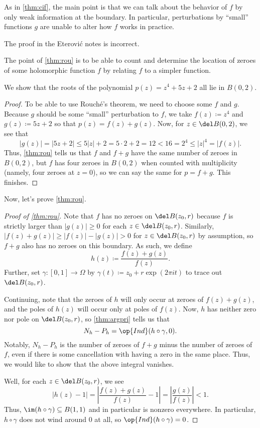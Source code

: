 \begin{remark}
	As in \autoref{thm:cif}, the main point is that we can talk about the behavior of $f$ by only weak information at the boundary. In particular, perturbations by ``small'' functions $g$ are unable to alter how $f$ works in practice.
\end{remark}
\begin{warn}
	The proof in the Eterovi\'c notes is incorrect.
\end{warn}
The point of \autoref{thm:rou} is to be able to count and determine the location of zeroes of some holomorphic function $f$ by relating $f$ to a simpler function.
\begin{exe}
	We show that the roots of the polynomial $p(z)=z^4+5z+2$ all lie in $B(0,2)$.
\end{exe}
\begin{proof}
	To be able to use Rouch\'e's theorem, we need to choose some $f$ and $g$. Because $g$ should be some ``small'' perturbation to $f$, we take $f(z)\coloneqq z^4$ and $g(z)\coloneqq 5z+2$ so that $p(z)=f(z)+g(z)$. Now, for $z\in\del B(0,2)$, we see that
	\[|g(z)|=|5z+2|\le5|z|+2=5\cdot2+2=12<16=2^4\le|z|^4=|f(z)|.\]
	Thus, \autoref{thm:rou} tells us that $f$ and $f+g$ have the same number of zeroes in $B(0,2)$, but $f$ has four zeroes in $B(0,2)$ when counted with multiplicity (namely, four zeroes at $z=0$), so we can say the same for $p=f+g$. This finishes.
\end{proof}
Now, let's prove \autoref{thm:rou}.
\begin{proof}[Proof of \autoref{thm:rou}]
	Note that $f$ has no zeroes on $\del B(z_0,r)$ because $f$ is strictly larger than $|g(z)|\ge0$ for each $z\in\del B(z_0,r)$. Similarly, $|f(z)+g(z)|\ge|f(z)|-|g(z)|>0$ for $z\in \del B(z_0,r)$ by assumption, so $f+g$ also has no zeroes on this boundary. As such, we define
	\[h(z)\coloneqq \frac{f(z)+g(z)}{f(z)}.\]
	Further, set $\gamma\colon [0,1]\to\Omega$ by $\gamma(t)\coloneqq z_0+r\exp(2\pi it)$ to trace out $\del B(z_0,r)$.

	Continuing, note that the zeroes of $h$ will only occur at zeroes of $f(z)+g(z)$, and the poles of $h(z)$ will occur only at poles of $f(z)$. Now, $h$ has neither zero nor pole on $\del B(z_0,r)$, so \autoref{thm:argpri} tells us that
	\[N_h-P_h=\op{Ind}(h\circ\gamma,0).\]
	Notably, $N_h-P_h$ is the number of zeroes of $f+g$ minus the number of zeroes of $f$, even if there is some cancellation with having a zero in the same place. Thus, we would like to show that the above integral vanishes.

	Well, for each $z\in\del B(z_0,r)$, we see
	\[|h(z)-1|=\left|\frac{f(z)+g(z)}{f(z)}-1\right|=\left|\frac{g(z)}{f(z)}\right|<1.\]
	Thus, $\im(h\circ\gamma)\subseteq B(1,1)$ and in particular is nonzero everywhere. In particular, $h\circ\gamma$ does not wind around $0$ at all, so $\op{Ind}(h\circ\gamma)=0$.
\end{proof}
